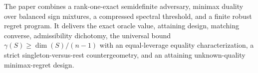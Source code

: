 The paper combines a rank-one-exact semidefinite adversary, minimax duality over balanced sign mixtures, a compressed spectral threshold, and a finite robust regret program. It delivers the exact oracle value, attaining design, matching converse, admissibility dichotomy, the universal bound \(\gamma(S)\geq\dim(S)/(n-1)\) with an equal-leverage equality characterization, a strict singleton-versus-rest countergeometry, and an attaining unknown-quality minimax-regret design.